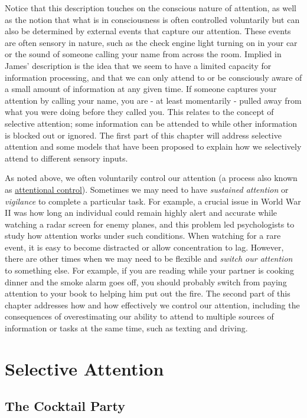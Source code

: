 \documentclass[
]{krantz}
\begin{document}
Notice that this description touches on the conscious nature of attention, as well as the notion that what is in consciousness is often controlled voluntarily but can also be determined by external events that capture our attention. These events are often sensory in nature, such as the check engine light turning on in your car or the sound of someone calling your name from across the room. Implied in James' description is the idea that we seem to have a limited capacity for information processing, and that we can only attend to or be consciously aware of a small amount of information at any given time. If someone captures your attention by calling your name, you are - at least momentarily - pulled away from what you were doing before they called you. This relates to the concept of selective attention; some information can be attended to while other information is blocked out or ignored. The first part of this chapter will address selective attention and some models that have been proposed to explain how we selectively attend to different sensory inputs.

As noted above, we often voluntarily control our attention (a process also known as \hyperref[attentional-control]{attentional control}). Sometimes we may need to have \emph{sustained attention} or \emph{vigilance} to complete a particular task. For example, a crucial issue in World War II was how long an individual could remain highly alert and accurate while watching a radar screen for enemy planes, and this problem led psychologists to study how attention works under such conditions. When watching for a rare event, it is easy to become distracted or allow concentration to lag. However, there are other times when we may need to be flexible and \emph{switch our attention} to something else. For example, if you are reading while your partner is cooking dinner and the smoke alarm goes off, you should probably switch from paying attention to your book to helping him put out the fire. The second part of this chapter addresses how and how effectively we control our attention, including the consequences of overestimating our ability to attend to multiple sources of information or tasks at the same time, such as texting and driving.

\section{Selective Attention}\label{selective-attention}

\subsection*{The Cocktail Party}\label{the-cocktail-party}
\end{document}
